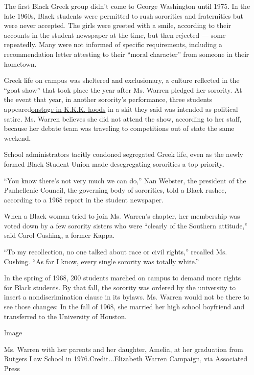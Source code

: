 The first Black Greek group didn't come to George Washington until 1975.
In the late 1960s, Black students were permitted to rush sororities and
fraternities but were never accepted. The girls were greeted with a
smile, according to their accounts in the student newspaper at the time,
but then rejected --- some repeatedly. Many were not informed of
specific requirements, including a recommendation letter attesting to
their ``moral character'' from someone in their hometown.

Greek life on campus was sheltered and exclusionary, a culture reflected
in the ``goat show'' that took place the year after Ms. Warren pledged
her sorority. At the event that year, in another sorority's performance,
three students
appeared\href{https://archive.org/details/gwu_cherry_tree_1968/page/n203/mode/2up}{onstage
in K.K.K. hoods} in a skit they said was intended as political satire.
Ms. Warren believes she did not attend the show, according to her staff,
because her debate team was traveling to competitions out of state the
same weekend.

School administrators tacitly condoned segregated Greek life, even as
the newly formed Black Student Union made desegregating sororities a top
priority.

``You know there's not very much we can do,'' Nan Webster, the president
of the Panhellenic Council, the governing body of sororities, told a
Black rushee, according to a 1968 report in the student newspaper.

When a Black woman tried to join Ms. Warren's chapter, her membership
was voted down by a few sorority sisters who were ``clearly of the
Southern attitude,'' said Carol Cushing, a former Kappa.

``To my recollection, no one talked about race or civil rights,''
recalled Ms. Cushing. ``As far I know, every single sorority was totally
white.''

In the spring of 1968, 200 students marched on campus to demand more
rights for Black students. By that fall, the sorority was ordered by the
university to insert a nondiscrimination clause in its bylaws. Ms.
Warren would not be there to see those changes: In the fall of 1968, she
married her high school boyfriend and transferred to the University of
Houston.

Image

Ms. Warren with her parents and her daughter, Amelia, at her graduation
from Rutgers Law School in 1976.Credit...Elizabeth Warren Campaign, via
Associated Press

